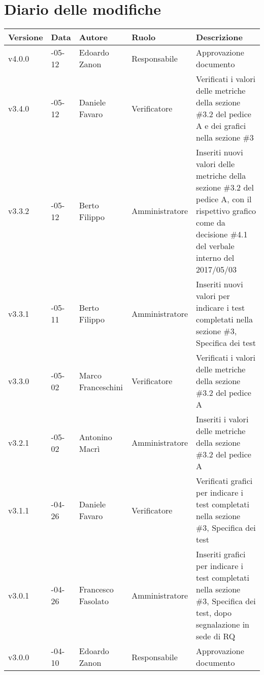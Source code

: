\vspace*{-10mm}
\section*{Diario delle modifiche}

\begin{longtable} { >{\centering}p{1.4cm} >{\centering}p{2cm} >{\centering}p{2.3cm} >{\centering}p{2.7cm} p{5.5cm} }
	\toprule
	\textbf{Versione} & \textbf{Data} & \textbf{Autore} & \textbf{Ruolo} & \centerline{\textbf{Descrizione}} \\
	\midrule
	\arrayrulecolor{gray}
	v4.0.0 & 2017-05-12 & Edoardo Zanon & Responsabile & Approvazione documento \\
	\addlinespace[0.4em]
	\midrule
	\addlinespace[0.4em]
	v3.4.0 & 2017-05-12 & Daniele Favaro & Verificatore & Verificati i valori delle metriche della sezione \#3.2 del pedice A e dei grafici nella sezione \#3 \\
	\addlinespace[0.4em]
	\midrule
	\addlinespace[0.4em]
	v3.3.2 & 2017-05-12 & Berto Filippo & Amministratore & Inseriti nuovi valori delle metriche della sezione \#3.2 del pedice A, con il rispettivo grafico come da decisione \#4.1 del verbale interno del 2017/05/03 \\
	\addlinespace[0.4em]
	\midrule
	\addlinespace[0.4em]	
	v3.3.1 & 2017-05-11 & Berto Filippo & Amministratore & Inseriti nuovi valori per indicare i test completati nella sezione \#3, Specifica dei test \\
	\addlinespace[0.4em]
	\midrule
	\addlinespace[0.4em]
	v3.3.0 & 2017-05-02 & Marco Franceschini & Verificatore & Verificati i valori delle metriche della sezione \#3.2 del pedice A \\
	\addlinespace[0.4em]
	\midrule
	\addlinespace[0.4em]
	v3.2.1 & 2017-05-02 & Antonino Macrì & Amministratore & Inseriti i valori delle metriche della sezione \#3.2 del pedice A \\
	\addlinespace[0.4em]
	\midrule
	\addlinespace[0.4em]
	v3.1.1 & 2017-04-26 & Daniele Favaro & Verificatore & Verificati grafici per indicare i test completati nella sezione \#3, Specifica dei test \\
	\addlinespace[0.4em]
	\midrule
	\addlinespace[0.4em]
	v3.0.1 & 2017-04-26 & Francesco Fasolato & Amministratore & Inseriti grafici per indicare i test completati nella sezione \#3, Specifica dei test, dopo segnalazione in sede di RQ \\
	\addlinespace[0.4em]
	\midrule
	\addlinespace[0.4em]
	v3.0.0 & 2017-04-10 & Edoardo Zanon & Responsabile & Approvazione documento \\

\end{longtable}

